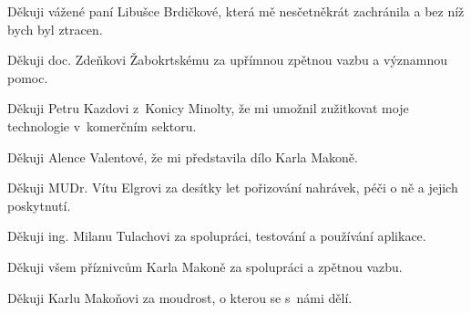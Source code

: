 Děkuji vážené paní Libušce Brdičkové, která mě nesčetněkrát zachránila a bez níž
bych byl ztracen.

Děkuji doc. Zdeňkovi Žabokrtskému za upřímnou zpětnou vazbu a významnou pomoc.

Děkuji Petru Kazdovi z~Konicy Minolty, že mi umožnil zužitkovat moje
technologie v~komerčním sektoru.

Děkuji Alence Valentové, že mi představila dílo Karla Makoně.

Děkuji MUDr. Vítu Elgrovi za desítky let pořizování nahrávek, péči o ně a jejich
poskytnutí.

Děkuji ing. Milanu Tulachovi za spolupráci, testování a používání aplikace.

Děkuji všem příznivcům Karla Makoně za spolupráci a zpětnou vazbu.

Děkuji Karlu Makoňovi za moudrost, o kterou se s~námi dělí.
